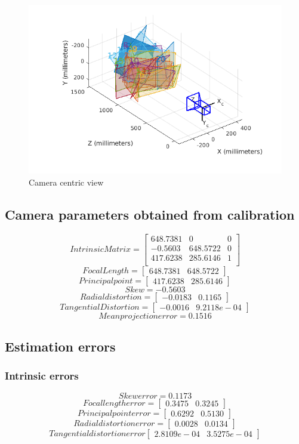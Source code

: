 \documentclass[11pt,a4paper]{article}
\begin{document}
\begin{figure}[H]
\includegraphics[scale=0.7]{camera_centric_view.png}
\caption{Camera centric view}
\end{figure}

\subsection{Camera parameters obtained from calibration}
\[ 
Intrinsic Matrix =
\begin{bmatrix}
648.7381 & 0 & 0 \\
-0.5603 & 648.5722 & 0 \\
417.6238 & 285.6146 & 1 \\
\end{bmatrix}
\]
\[ 
Focal Length = 
\begin{bmatrix}
648.7381 & 648.5722
\end{bmatrix}
\]
\[ 
Principal point =
\begin{bmatrix}
417.6238 & 285.6146
\end{bmatrix}
\]
\[ 
Skew = -0.5603
\]
\[
Radial distortion = 
\begin{bmatrix}
-0.0183 & 0.1165
\end{bmatrix}
\]
\[ 
Tangential Distortion = 
\begin{bmatrix}
-0.0016 & 9.2118e-04
\end{bmatrix}
\]
\[ 
Mean projection error = 0.1516
\]
\subsection{Estimation errors}
\subsubsection{Intrinsic errors}
\[
Skew error = 0.1173
\]
\[
Focal length error = 
\begin{bmatrix}
0.3475 & 0.3245
\end{bmatrix}
\]
\[
Principal point error = 
\begin{bmatrix}
0.6292 & 0.5130
\end{bmatrix}
\]
\[
Radial distortion error = 
\begin{bmatrix}
0.0028 & 0.0134
\end{bmatrix}
\]
\[
Tangential distortion error
\begin{bmatrix}
2.8109e-04 & 3.5275e-04
\end{bmatrix}
\]
\end{document}
